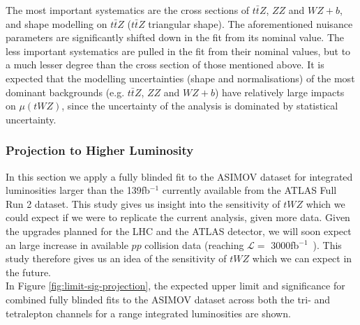 The most important systematics are the cross sections of $t\bar{t}Z$, $ZZ$ and $WZ+b$, and shape modelling on $t\bar{t}Z$ ($t\bar{t}Z$ triangular shape). The aforementioned nuisance parameters are significantly shifted down in the fit from its nominal value. The less important systematics are pulled in the fit from their nominal values, but to a much lesser degree than the cross section of those mentioned above. It is expected that the modelling uncertainties (shape and normalisations) of the most dominant backgrounds (e.g. $t\bar{t}Z$, $ZZ$ and $WZ+b$) have relatively large impacts on $\mu(tWZ)$, since the uncertainty of the analysis is dominated by statistical uncertainty.


\subsubsection{Projection to Higher Luminosity}

In this section we apply a fully blinded fit to the ASIMOV dataset for integrated luminosities larger than the 139fb$^{-1}$ currently available from the ATLAS Full Run 2 dataset. This study gives us insight into the sensitivity of $tWZ$ which we could expect if we were to replicate the current analysis, given more data. Given the upgrades planned for the LHC and the ATLAS detector, we will soon expect an large increase in available $pp$ collision data (reaching $\mathcal{L} =$ 3000fb$^{-1}$~\cite{HL-LHC-paper}). This study therefore gives us an idea of the sensitivity of $tWZ$ which we can expect in the future. \\

In Figure \ref{fig:limit-sig-projection}, the expected upper limit and significance for combined fully blinded fits to the ASIMOV dataset across both the tri- and tetralepton channels for a range integrated luminosities are shown.

